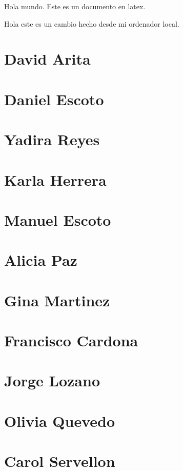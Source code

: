 \documentclass[10pt]{book}
\begin{document}
Hola mundo. Este es un documento en latex.

Hola este es un cambio hecho desde mi ordenador local.

\section{David Arita}


\section{Daniel Escoto}


\section{Yadira Reyes}


\section{Karla Herrera}


\section{Manuel Escoto}


\section{Alicia Paz}


\section{Gina Martinez}


\section{Francisco Cardona}


\section{Jorge Lozano}


\section{Olivia Quevedo}


\section{Carol Servellon}

\end{document}
